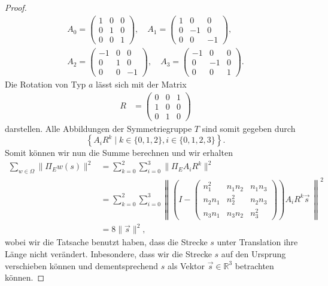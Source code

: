 \begin{proof}
\begin{align}
    A_0 = \begin{pmatrix} 1 & 0 & 0 \\ 0 & 1 & 0 \\ 0 & 0 & 1 \end{pmatrix}, \quad
    A_1 = \begin{pmatrix} 1 & 0 & 0 \\ 0 & -1 & 0 \\ 0 & 0 & -1 \end{pmatrix}, \nonumber \\
    A_2 = \begin{pmatrix} -1 & 0 & 0 \\ 0 & 1 & 0 \\ 0 & 0 & -1 \end{pmatrix}, \quad
    A_3 = \begin{pmatrix} -1 & 0 & 0 \\ 0 & -1 & 0 \\ 0 & 0 & 1 \end{pmatrix}. \nonumber
\end{align}
Die Rotation von Typ $a$ lässt sich mit der Matrix
\begin{align}
    R &= \begin{pmatrix} 0 & 0 & 1 \\ 1 & 0 & 0 \\ 0 & 1 & 0 \end{pmatrix} \nonumber
\end{align}
darstellen. Alle Abbildungen der Symmetriegruppe $T$ sind somit gegeben durch
$$ \left\{A_i R^k \mid k \in \{0,1,2\}, i \in \{0,1,2,3\} \right\}.$$
Somit können wir nun die Summe berechnen und wir erhalten
\begin{align}
    \sum_{w \in \Omega} \|\Pi_{E}w(s)\|^2  &= \sum_{k=0}^2 \sum_{i=0}^3 \|\Pi_{E}A_iR^k\|^2 \nonumber \\ 
    &=  \sum_{k=0}^2 \sum_{i=0}^3 \left\|\left(I - \begin{pmatrix}
        n_1^2 & n_1 n_2 & n_1 n_3 \\
        n_2 n_1 & n_2^2 & n_2 n_3 \\
        n_3 n_1 & n_3 n_2 & n_3^2
    \end{pmatrix}\right)A_iR^k\vec{s} \ \right\|^2  \nonumber \\
    &=8 \|\vec{s}\|^2, \nonumber
\end{align}
wobei wir die Tatsache benutzt haben, dass die Strecke $s$ unter Translation ihre Länge nicht verändert. Inbesondere, dass wir die Strecke $s$ auf den Ursprung verschieben können und dementsprechend $s$ als Vektor $\vec{s} \in \mathbb{R}^3$ betrachten können. 
\end{proof}
